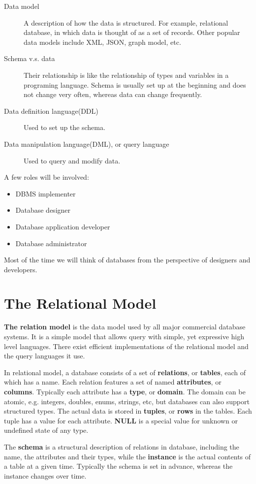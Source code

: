 \begin{description}
\item[Data model]A description of how the data is structured. For example, relational database, in which data is thought of as a set of records. Other popular data models include XML, JSON, graph model, etc.
\item[Schema v.s. data]Their relationship is like the relationship of types and variables in a programing language. Schema is usually set up at the beginning and does not change very often, whereas data can change frequently.
\item[Data definition language(DDL)]Used to set up the schema.
\item[Data manipulation language(DML), or query language]Used to query and modify data.
\end{description}
A few roles will be involved:
\begin{itemize}
\item DBMS implementer
\item Database designer
\item Database application developer
\item Database administrator
\end{itemize}
Most of the time we will think of databases from the perspective of designers and developers.
\section{The Relational Model}
\textbf{The relation model} is the data model used by all major commercial database systems. It is a simple model that allows query with simple, yet expressive high level languages. There exist efficient implementations of the relational model and the query languages it use. 

In relational model, a database consists of a set of \textbf{relations}, or \textbf{tables}, each of which has a name. Each relation features a set of named \textbf{attributes}, or \textbf{columns}. Typically each attribute has a \textbf{type}, or \textbf{domain}. The domain can be atomic, e.g. integers, doubles, enums, strings, etc, but databases can also support structured types. The actual data is stored in \textbf{tuples}, or \textbf{rows} in the tables. Each tuple has a value for each attribute. \textbf{NULL} is a special value for unknown or undefined state of any type.

The \textbf{schema} is a structural description of relations in database, including the name, the attributes and their types, while the \textbf{instance} is the actual contents of a table at a given time. Typically the schema is set in advance, whereas the instance changes over time. 

